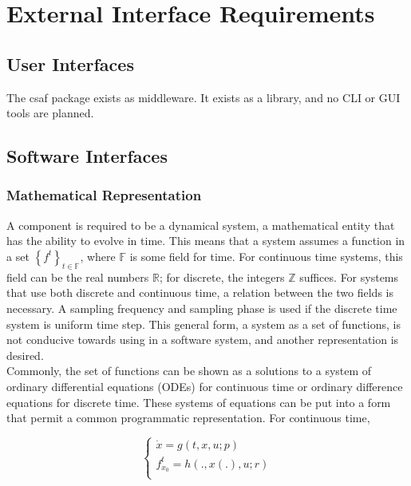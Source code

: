 \chapter{External Interface Requirements}

\section{User Interfaces}

The \acrshort{csaf}  package exists as middleware. It exists as a library, and no CLI or GUI tools are planned.

\section{Software Interfaces}

\subsection{Mathematical Representation}
A component is required to be a dynamical system, a mathematical entity that has the ability to evolve in time. This means that a system assumes a function in a set $\left\{ f^t \right\}_{t \in \mathbb F}$, where $\mathbb F$ is some field for time. For continuous time systems, this field can be the real numbers $\mathbb R$; for discrete, the integers $\mathbb Z$ suffices. For systems that use both discrete and continuous time, a relation between the two fields is necessary. A sampling frequency and sampling phase is used if the discrete time system is uniform time step. This general form, a system as a set of functions, is not conducive towards using in a software system, and another representation is desired. \\

Commonly, the set of functions can be shown as a solutions to a system of ordinary differential equations (ODEs) for continuous time or ordinary difference equations for discrete time. These systems of equations can be put into a form that permit a common programmatic representation. For continuous time,

\begin{equation}
\begin{cases}
\dot x = g(t, x, u; p) \\
f_{x_0}^t = h(., x(.), u; r) \\
\end{cases}
\end{equation}

